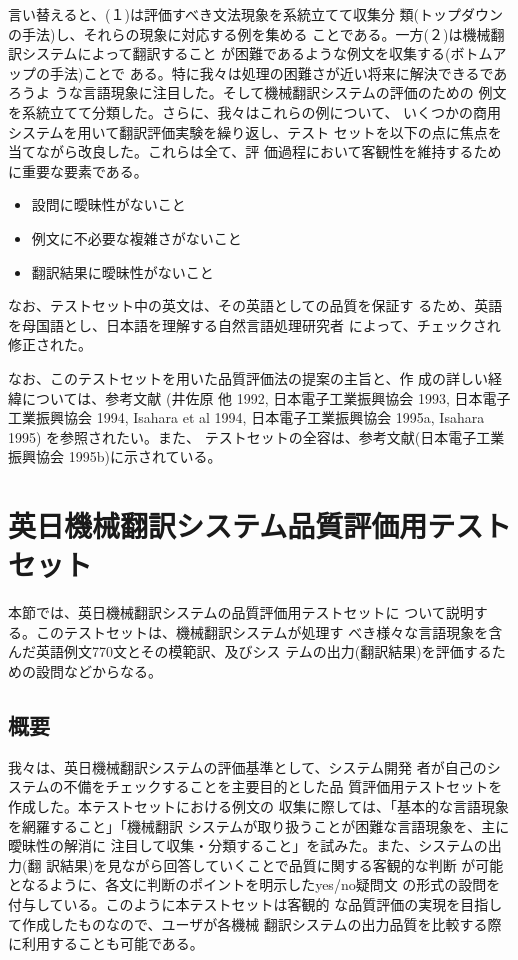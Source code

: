 言い替えると、(１)は評価すべき文法現象を系統立てて収集分
類(トップダウンの手法)し、それらの現象に対応する例を集める
ことである。一方(２)は機械翻訳システムによって翻訳すること
が困難であるような例文を収集する(ボトムアップの手法)ことで
ある。特に我々は処理の困難さが近い将来に解決できるであろうよ
うな言語現象に注目した。そして機械翻訳システムの評価のための
例文を系統立てて分類した。さらに、我々はこれらの例について、
いくつかの商用システムを用いて翻訳評価実験を繰り返し、テスト
セットを以下の点に焦点を当てながら改良した。これらは全て、評
価過程において客観性を維持するために重要な要素である。\\


\begin{itemize}
\item 設問に曖昧性がないこと
\item 例文に不必要な複雑さがないこと
\item 翻訳結果に曖昧性がないこと\\
\end{itemize}


なお、テストセット中の英文は、その英語としての品質を保証す
るため、英語を母国語とし、日本語を理解する自然言語処理研究者
によって、チェックされ修正された。

なお、このテストセットを用いた品質評価法の提案の主旨と、作
成の詳しい経緯については、参考文献
(井佐原 他 1992, 日本電子工業振興協会 1993, 日本電子工業振興協会
1994, Isahara et al 1994, 日本電子工業振興協会 1995a, Isahara 1995)
を参照されたい。また、
テストセットの全容は、参考文献(日本電子工業振興協会 1995b)に示されている。


\section{英日機械翻訳システム品質評価用テストセット}

本節では、英日機械翻訳システムの品質評価用テストセットに
ついて説明する。このテストセットは、機械翻訳システムが処理す
べき様々な言語現象を含んだ英語例文770文とその模範訳、及びシス
テムの出力(翻訳結果)を評価するための設問などからなる。

\subsection{概要}

我々は、英日機械翻訳システムの評価基準として、システム開発
者が自己のシステムの不備をチェックすることを主要目的とした品
質評価用テストセットを作成した。本テストセットにおける例文の
収集に際しては、「基本的な言語現象を網羅すること」「機械翻訳
システムが取り扱うことが困難な言語現象を、主に曖昧性の解消に
注目して収集・分類すること」を試みた。また、システムの出力(翻
訳結果)を見ながら回答していくことで品質に関する客観的な判断
が可能となるように、各文に判断のポイントを明示したyes/no疑問文
の形式の設問を付与している。このように本テストセットは客観的
な品質評価の実現を目指して作成したものなので、ユーザが各機械
翻訳システムの出力品質を比較する際に利用することも可能である。

